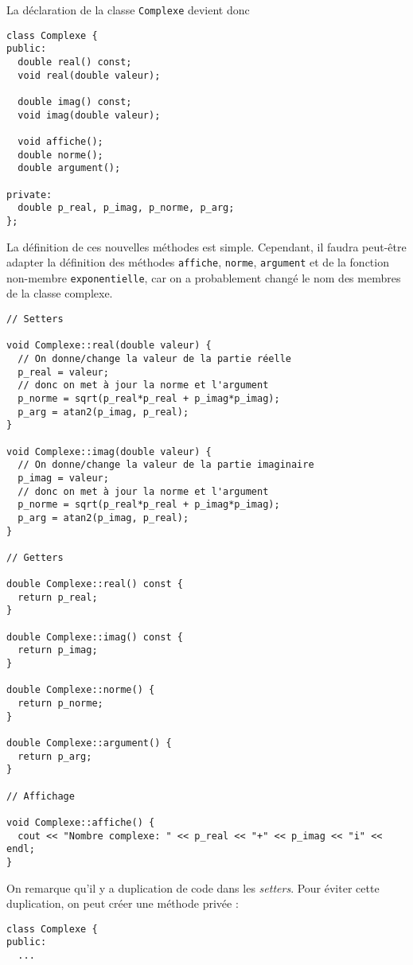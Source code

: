 \documentclass{book}
\newcommand{\inline}[1]{\texttt{#1}}
\begin{document}
\begin{correction}
La déclaration de la classe \inline{Complexe} devient donc
\begin{verbatim}
class Complexe {
public:
  double real() const;
  void real(double valeur);

  double imag() const;
  void imag(double valeur);

  void affiche();
  double norme();
  double argument();

private:
  double p_real, p_imag, p_norme, p_arg;
};
\end{verbatim}

La définition de ces nouvelles méthodes est simple. Cependant, il faudra peut-être adapter la définition des méthodes \inline{affiche}, \inline{norme}, \inline{argument} et de la fonction non-membre \inline{exponentielle}, car on a probablement changé le nom des membres de la classe complexe.

\begin{verbatim}
// Setters

void Complexe::real(double valeur) {
  // On donne/change la valeur de la partie réelle 
  p_real = valeur;
  // donc on met à jour la norme et l'argument
  p_norme = sqrt(p_real*p_real + p_imag*p_imag);
  p_arg = atan2(p_imag, p_real);
}

void Complexe::imag(double valeur) {
  // On donne/change la valeur de la partie imaginaire 
  p_imag = valeur;
  // donc on met à jour la norme et l'argument
  p_norme = sqrt(p_real*p_real + p_imag*p_imag);
  p_arg = atan2(p_imag, p_real);
}

// Getters

double Complexe::real() const {
  return p_real;
}

double Complexe::imag() const {
  return p_imag;
}

double Complexe::norme() {
  return p_norme;
}

double Complexe::argument() {
  return p_arg;
}

// Affichage

void Complexe::affiche() {
  cout << "Nombre complexe: " << p_real << "+" << p_imag << "i" << endl;
}

\end{verbatim}

On remarque qu'il y a duplication de code dans les \textit{setters}. Pour éviter cette duplication, on peut créer une méthode privée :
\begin{verbatim}
class Complexe {
public:
  ...


\end{verbatim}
\end{correction}
\end{document}
